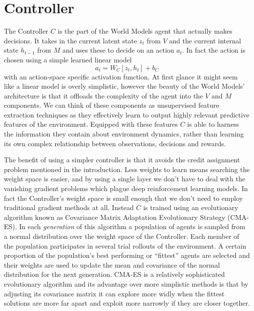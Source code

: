\documentclass{article}
\numberwithin{figure}{section}
\theoremstyle{definition}
\begin{document}
\section{Controller}
The Controller $C$ is the part of the World Models agent that actually makes decisions.
It takes in the current latent state $z_t$ from $V$ and the current internal state $h_{t-1}$ from $M$ and uses these to decide on an action $a_t$.
In fact the action is chosen using a simple learned linear model
$$a_t = W_C [z_t, h_t] + b_C$$
with an action-space specific activation function.
At first glance it might seem like a linear model is overly simplistic, however the beauty of the World Models' architecture is that it offloads the complexity of the agent into the $V$ and $M$ components.
We can think of these components as unsupervised feature extraction techniques as they effectively learn to output highly relevant predictive features of the environment.
Equipped with these features $C$ is able to harness the information they contain about environment dynamics, rather than learning its own complex relationship between observations, decisions and rewards.

The benefit of using a simpler controller is that it avoids the credit assignment problem mentioned in the introduction.
Less weights to learn means searching the weight space is easier, and by using a single layer we don't have to deal with the vanishing gradient problems which plague deep reinforcement learning models.
In fact the Controller's weight space is small enough that we don't need to employ traditional gradient methods at all.
Instead $C$ is trained using an evolutionary algorithm known as Covariance Matrix Adaptation Evolutionary Strategy (CMA-ES).
In each \textit{generation} of this algorithm a population of agents is sampled from a normal distribution over the weight space of the Controller.
Each member of the population participates in several trial rollouts of the environment.
A certain proportion of the population's best performing or ``fittest'' agents are selected and their weights are used to update the mean and covariance of the normal distribution for the next generation.
CMA-ES is a relatively sophisticated evolutionary algorithm and its advantage over more simplistic methods is that by adjusting its covariance matrix it can explore more widly when the fittest solutions are more far apart and exploit more narrowly if they are closer together.
\end{document}

